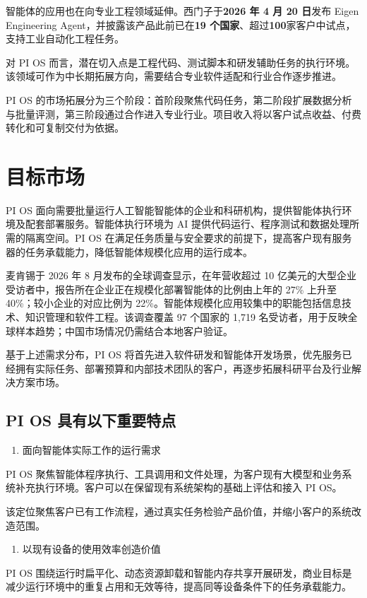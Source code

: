 智能体的应用也在向专业工程领域延伸。西门子于\textbf{2026 年 4 月 20 日}发布 Eigen Engineering Agent，并披露该产品此前已在\textbf{19 个国家}、超过\textbf{100}家客户中试点，支持工业自动化工程任务。

对 PI OS 而言，潜在切入点是工程代码、测试脚本和研发辅助任务的执行环境。该领域可作为中长期拓展方向，需要结合专业软件适配和行业合作逐步推进。

PI OS 的市场拓展分为三个阶段：首阶段聚焦代码任务，第二阶段扩展数据分析与批量评测，第三阶段通过合作进入专业行业。项目收入将以客户试点收益、付费转化和可复制交付为依据。

\section{目标市场}\label{sec:4.3}
PI OS 面向需要批量运行人工智能智能体的企业和科研机构，提供智能体执行环境及配套部署服务。智能体执行环境为 AI 提供代码运行、程序测试和数据处理所需的隔离空间。PI OS 在满足任务质量与安全要求的前提下，提高客户现有服务器的任务承载能力，降低智能体规模化应用的运行成本。

麦肯锡于 2026 年 8 月发布的全球调查显示，在年营收超过 10 亿美元的大型企业受访者中，报告所在企业正在规模化部署智能体的比例由上年的 27\% 上升至 40\%；较小企业的对应比例为 22\%。智能体规模化应用较集中的职能包括信息技术、知识管理和软件工程。该调查覆盖 97 个国家的 1,719 名受访者，用于反映全球样本趋势；中国市场情况仍需结合本地客户验证。

基于上述需求分布，PI OS 将首先进入软件研发和智能体开发场景，优先服务已经拥有实际任务、部署预算和内部技术团队的客户，再逐步拓展科研平台及行业解决方案市场。

\subsection{PI OS 具有以下重要特点}\label{sec:4.3.1}
\begin{enumerate}
\item 面向智能体实际工作的运行需求
\end{enumerate}
PI OS 聚焦智能体程序执行、工具调用和文件处理，为客户现有大模型和业务系统补充执行环境。客户可以在保留现有系统架构的基础上评估和接入 PI OS。

该定位聚焦客户已有工作流程，通过真实任务检验产品价值，并缩小客户的系统改造范围。

\begin{enumerate}
\item 以现有设备的使用效率创造价值
\end{enumerate}
PI OS 围绕运行时扁平化、动态资源卸载和智能内存共享开展研发，商业目标是减少运行环境中的重复占用和无效等待，提高同等设备条件下的任务承载能力。

